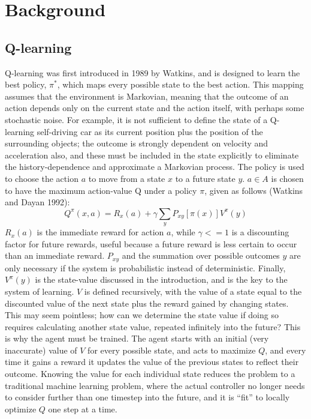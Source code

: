 \documentclass[journal,onecolumn]{IEEEtran}
\begin{document}
\section{Background}
\subsection{Q-learning} Q-learning was first introduced in 1989 by Watkins, and is designed to learn the best policy, $\pi^{*}$, which maps every possible state to the best action. This mapping assumes that the environment is Markovian, meaning that the outcome of an action depends only on the current state and the action itself, with perhaps some stochastic noise.  For example, it is not sufficient to define the state of a Q-learning self-driving car as its current position plus the position of the surrounding objects; the outcome is strongly dependent on velocity and acceleration also, and these must be included in the state explicitly to eliminate the history-dependence and approximate a Markovian process.  The policy is used to choose the action $a$ to move from a state $x$ to a future state $y$. $a \in A$ is chosen to have the maximum action-value Q under a policy $\pi$, given as follows (Watkins and Dayan 1992):
\[
{{Q}^{\pi }}(x,a)={{R}_{x}}(a)+\gamma \sum\limits_{y}{{{P}_{xy}}[\pi (x)]{{V}^{\pi }}\left( y \right)}
\]
$R_{x}(a)$ is the immediate reward for action $a$, while $\gamma <= 1$ is a discounting factor for future rewards, useful because a future reward is less certain to occur than an immediate reward.  $P_{xy}$ and the summation over possible outcomes $y$ are only necessary if the system is probabilistic instead of deterministic.  Finally, $V^{\pi}(y)$ is the state-value discussed in the introduction, and is the key to the system of learning.  $V$ is defined recursively, with the value of a state equal to the discounted value of the next state plus the reward gained by changing states.  This may seem pointless; how can we determine the state value if doing so requires calculating another state value, repeated infinitely into the future?  This is why the agent must be trained.  The agent starts with an initial (very inaccurate) value of $V$ for every possible state, and acts to maximize $Q$, and every time it gains a reward it updates the value of the previous states to reflect their outcome.  Knowing the value for each individual state reduces the problem to a traditional machine learning problem, where the actual controller no longer needs to consider further than one timestep into the future, and it is “fit” to locally optimize $Q$ one step at a time. \\\\
\end{document}
